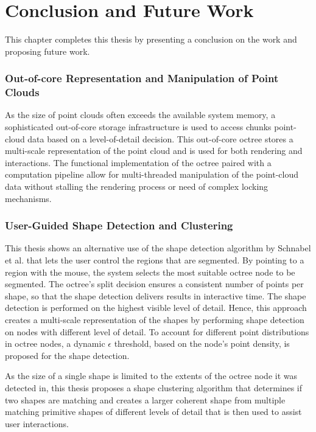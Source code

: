 \chapter{Conclusion and Future Work}
\label{chap:conclusion}


This chapter completes this thesis by presenting a conclusion on the work and proposing future work.

\subsection*{Out-of-core Representation and Manipulation of Point Clouds}

As the size of point clouds often exceeds the available system memory, a sophisticated out-of-core storage infrastructure is used to access chunks point-cloud data based on a level-of-detail decision. This out-of-core octree stores a multi-scale representation of the point cloud and is used for both rendering and interactions. The functional implementation of the octree paired with a computation pipeline allow for multi-threaded manipulation of the point-cloud data without stalling the rendering process or need of complex locking mechanisms. 


\subsection*{User-Guided Shape Detection and Clustering}

This thesis shows an alternative use of the shape detection algorithm by Schnabel et al. \cite{schnabel-2007-efficient} that lets the user control the regions that are segmented. By pointing to a region with the mouse, the system selects the most suitable octree node to be segmented. The octree's split decision ensures a consistent number of points per shape, so that the shape detection delivers results in interactive time. The shape detection is performed on the highest visible level of detail. Hence, this approach creates a multi-scale representation of the shapes by performing shape detection on nodes with different level of detail. To account for different point distributions in octree nodes, a dynamic $\epsilon$ threshold, based on the node's point density, is proposed for the shape detection. 

\par

As the size of a single shape is limited to the extents of the octree node it was detected in, this thesis proposes a shape clustering algorithm that determines if two shapes are matching and creates a larger coherent shape from multiple matching primitive shapes of different levels of detail that is then used to assist user interactions. 



